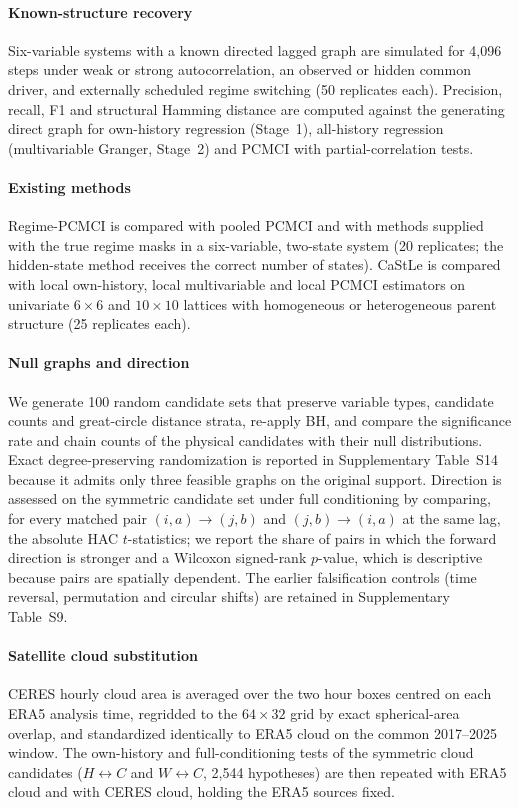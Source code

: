 \documentclass[preprint,12pt]{elsarticle}
\begin{document}
\paragraph{Known-structure recovery} Six-variable systems with a known directed lagged graph are simulated for 4,096 steps under weak or strong autocorrelation, an observed or hidden common driver, and externally scheduled regime switching (50 replicates each). Precision, recall, F1 and structural Hamming distance are computed against the generating direct graph for own-history regression (Stage~1), all-history regression (multivariable Granger, Stage~2) and PCMCI with partial-correlation tests.

\paragraph{Existing methods} Regime-PCMCI is compared with pooled PCMCI and with methods supplied with the true regime masks in a six-variable, two-state system (20 replicates; the hidden-state method receives the correct number of states). CaStLe is compared with local own-history, local multivariable and local PCMCI estimators on univariate $6\times6$ and $10\times10$ lattices with homogeneous or heterogeneous parent structure (25 replicates each).

\paragraph{Null graphs and direction} We generate 100 random candidate sets that preserve variable types, candidate counts and great-circle distance strata, re-apply BH, and compare the significance rate and chain counts of the physical candidates with their null distributions. Exact degree-preserving randomization is reported in Supplementary Table~S14 because it admits only three feasible graphs on the original support. Direction is assessed on the symmetric candidate set under full conditioning by comparing, for every matched pair $(i,a)\rightarrow(j,b)$ and $(j,b)\rightarrow(i,a)$ at the same lag, the absolute HAC $t$-statistics; we report the share of pairs in which the forward direction is stronger and a Wilcoxon signed-rank $p$-value, which is descriptive because pairs are spatially dependent. The earlier falsification controls (time reversal, permutation and circular shifts) are retained in Supplementary Table~S9.

\paragraph{Satellite cloud substitution} CERES hourly cloud area is averaged over the two hour boxes centred on each ERA5 analysis time, regridded to the $64\times32$ grid by exact spherical-area overlap, and standardized identically to ERA5 cloud on the common 2017--2025 window. The own-history and full-conditioning tests of the symmetric cloud candidates ($H\leftrightarrow C$ and $W\leftrightarrow C$, 2,544 hypotheses) are then repeated with ERA5 cloud and with CERES cloud, holding the ERA5 sources fixed.
\end{document}

